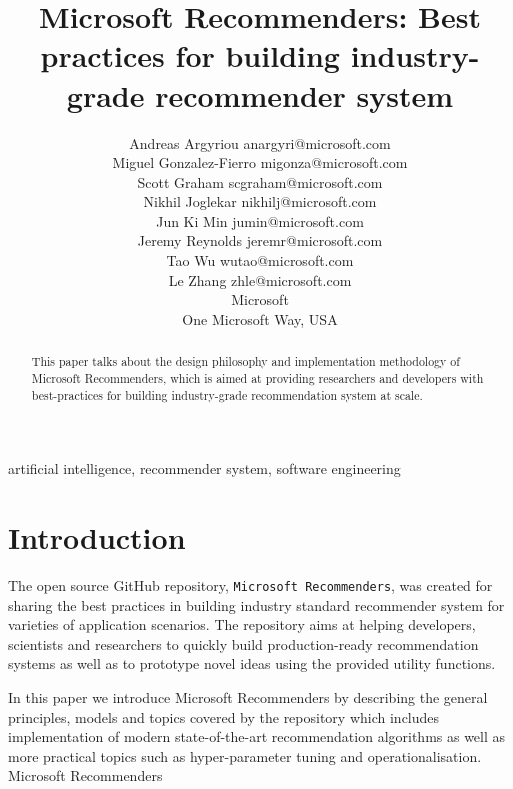 \documentclass[twoside,11pt]{article}
\begin{document}
\title{Microsoft Recommenders: Best practices for building industry-grade recommender system}

\author{\name Andreas Argyriou \email anargyri@microsoft.com \\
  \name Miguel Gonzalez-Fierro \email migonza@microsoft.com \\
  \name Scott Graham \email scgraham@microsoft.com \\
  \name Nikhil Joglekar \email nikhilj@microsoft.com \\
  \name Jun Ki Min \email jumin@microsoft.com \\
  \name Jeremy Reynolds \email jeremr@microsoft.com \\
  \name Tao Wu \email wutao@microsoft.com \\
  \name Le Zhang \email zhle@microsoft.com \\
  \addr Microsoft \\
  One Microsoft Way, USA
}


\maketitle

\begin{abstract}%
  This paper talks about the design philosophy and implementation methodology of Microsoft Recommenders, which is aimed at providing researchers and developers with best-practices for building  industry-grade recommendation system at scale.
\end{abstract}

\begin{keywords}
  artificial intelligence, recommender system, software engineering
\end{keywords}

\section{Introduction}
The open source GitHub repository, \verb|Microsoft Recommenders|, was created for sharing the best practices in building industry standard recommender system for varieties of application scenarios. The repository aims at helping developers, scientists and researchers to quickly build production-ready recommendation systems as well as to prototype novel ideas using the provided utility functions.

In this paper we introduce Microsoft Recommenders by describing the general principles, models and topics covered by the repository which includes implementation of modern state-of-the-art recommendation algorithms as well as more practical topics such as hyper-parameter tuning and operationalisation. Microsoft Recommenders 
\end{document}
